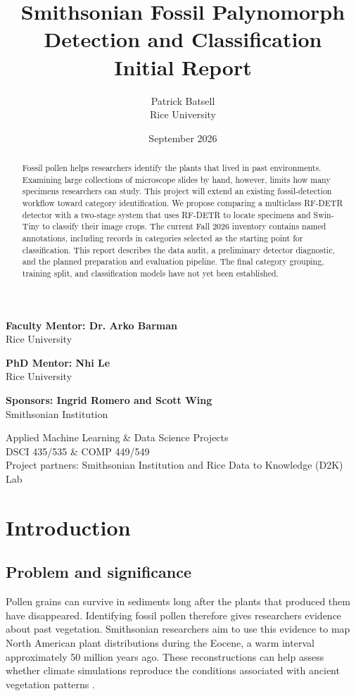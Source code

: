 \documentclass[11pt,letterpaper]{article}
\title{Smithsonian Fossil Palynomorph\\Detection and Classification\\[8pt]\large Initial Report}
\author{Patrick Batsell\\Rice University}
\date{September 2026}
\begin{document}
\maketitle
\vspace{1em}
\begin{abstract}
Fossil pollen helps researchers identify the plants that lived in past environments. Examining large collections of microscope slides by hand, however, limits how many specimens researchers can study. This project will extend an existing fossil-detection workflow toward category identification. We propose comparing a multiclass RF-DETR detector with a two-stage system that uses RF-DETR to locate specimens and Swin-Tiny to classify their image crops. The current Fall 2026 inventory contains \NamedCount{} named annotations, including \YesCount{} records in \YesCategories{} categories selected as the starting point for classification. This report describes the data audit, a preliminary detector diagnostic, and the planned preparation and evaluation pipeline. The final category grouping, training split, and classification models have not yet been established.
\end{abstract}
\vspace{1.5em}
\textbf{Faculty Mentor: Dr. Arko Barman}\\
Rice University

\vspace{0.5em}
\textbf{PhD Mentor: Nhi Le}\\
Rice University

\vspace{0.5em}
\textbf{Sponsors: Ingrid Romero and Scott Wing}\\
Smithsonian Institution
\vfill
\begin{center}
Applied Machine Learning \& Data Science Projects\\
DSCI 435/535 \& COMP 449/549\\[6pt]
Project partners: Smithsonian Institution and Rice Data to Knowledge (D2K) Lab
\end{center}
\newpage
\tableofcontents
\newpage

\section{Introduction}
\subsection{Problem and significance}
Pollen grains can survive in sediments long after the plants that produced them have disappeared. Identifying fossil pollen therefore gives researchers evidence about past vegetation. Smithsonian researchers aim to use this evidence to map North American plant distributions during the Eocene, a warm interval approximately 50 million years ago. These reconstructions can help assess whether climate simulations reproduce the conditions associated with ancient vegetation patterns \citep{proposal2026}.
\end{document}
